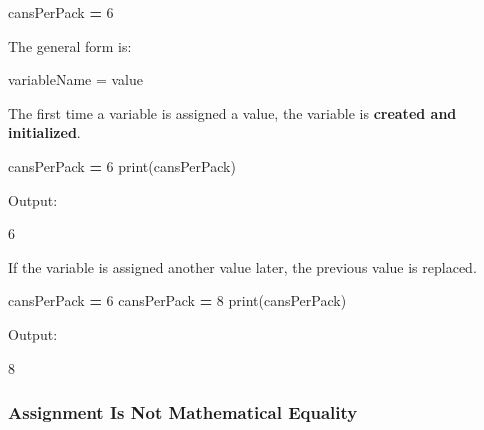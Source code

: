 \documentclass[
]{article}
\newenvironment{Shaded}{\begin{snugshade}}{\end{snugshade}}
\newcommand{\BuiltInTok}[1]{#1}
\newcommand{\DecValTok}[1]{\textcolor[rgb]{0.00,0.00,0.81}{#1}}
\newcommand{\NormalTok}[1]{#1}
\newcommand{\OperatorTok}[1]{\textcolor[rgb]{0.81,0.36,0.00}{\textbf{#1}}}
\begin{document}
\begin{Shaded}
\begin{Highlighting}[]
\NormalTok{cansPerPack }\OperatorTok{=} \DecValTok{6}
\end{Highlighting}
\end{Shaded}

The general form is:

\begin{Shaded}
\begin{Highlighting}[]
\NormalTok{variableName = value}
\end{Highlighting}
\end{Shaded}

The first time a variable is assigned a value, the variable is
\textbf{created and initialized}.

\begin{Shaded}
\begin{Highlighting}[]
\NormalTok{cansPerPack }\OperatorTok{=} \DecValTok{6}
\BuiltInTok{print}\NormalTok{(cansPerPack)}
\end{Highlighting}
\end{Shaded}

Output:

\begin{Shaded}
\begin{Highlighting}[]
\NormalTok{6}
\end{Highlighting}
\end{Shaded}

If the variable is assigned another value later, the previous value is
replaced.

\begin{Shaded}
\begin{Highlighting}[]
\NormalTok{cansPerPack }\OperatorTok{=} \DecValTok{6}
\NormalTok{cansPerPack }\OperatorTok{=} \DecValTok{8}
\BuiltInTok{print}\NormalTok{(cansPerPack)}
\end{Highlighting}
\end{Shaded}

Output:

\begin{Shaded}
\begin{Highlighting}[]
\NormalTok{8}
\end{Highlighting}
\end{Shaded}

\subsubsection{Assignment Is Not Mathematical
Equality}\label{assignment-is-not-mathematical-equality}
\end{document}
